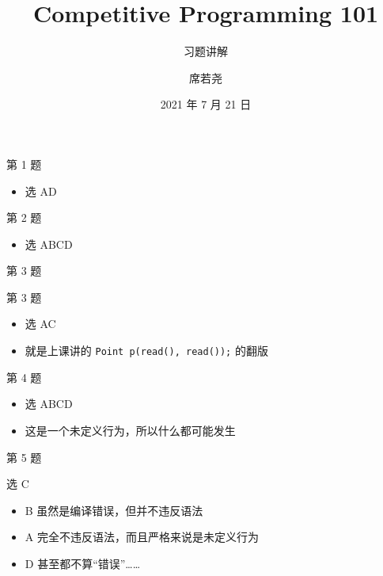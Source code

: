 \documentclass[10pt,mathserif]{beamer}
\title{Competitive Programming 101}
\subtitle{习题讲解}
\institute{西安电子科技大学程序设计竞赛实训基地}
\author{席若尧}
\date{2021 年 7 月 21 日}
\begin{document}
%
{\xdbg {}}

\newcommand{\paragraph}[1]{}

\begin{frame}{第 1 题}
	
	\pause
	\begin{itemize}
		\item 选 AD
	\end{itemize}
\end{frame}

\begin{frame}{第 2 题}
	
	\pause
	\begin{itemize}
		\item 选 ABCD
	\end{itemize}
\end{frame}

\begin{frame}{第 3 题}
	
\end{frame}

\begin{frame}{第 3 题}
	\begin{itemize}
		\item 选 AC
		\item 就是上课讲的 \lstinline{Point p(read(), read());} 的翻版
	\end{itemize}
\end{frame}

\begin{frame}{第 4 题}
	
	\pause
	\begin{itemize}
		\item 选 ABCD
		\item 这是一个未定义行为，所以什么都可能发生
	\end{itemize}
\end{frame}

\begin{frame}{第 5 题}
	
	\pause
	选 C
	\begin{itemize}
		\item B 虽然是编译错误，但并不违反语法
		\item A 完全不违反语法，而且严格来说是未定义行为
		\item D 甚至都不算“错误”……
	\end{itemize}
\end{frame}
\end{document}
